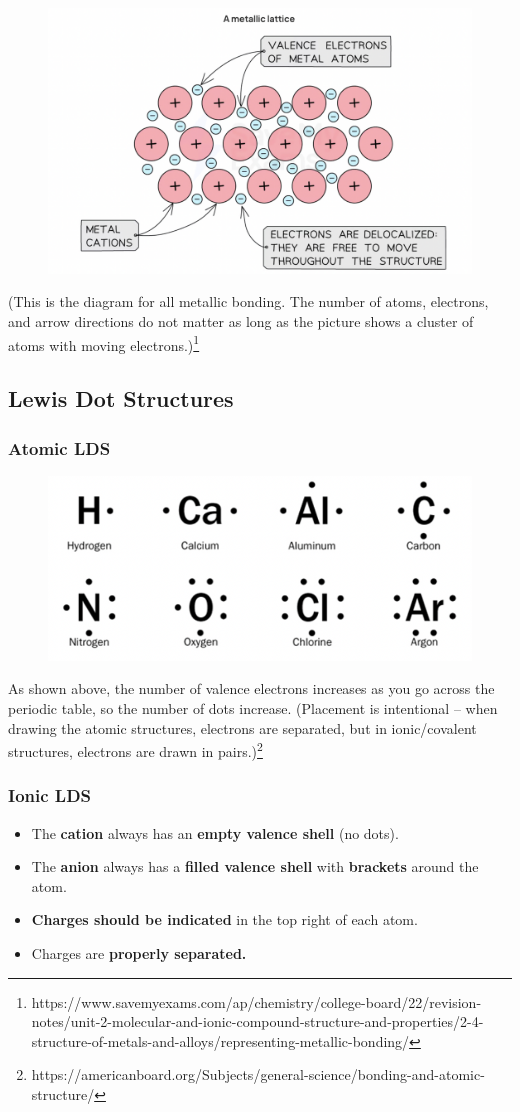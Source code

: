 \documentclass[a4paper, 12pt]{article}
\begin{document}
\begin{figure}[ht]
    \centering
    \includegraphics[width=0.5\linewidth]{metalliclattice.png}
    \label{fig:1.3?}
\end{figure}
\noindent (This is the diagram for all metallic bonding. The number of atoms, electrons, and arrow directions do not matter as long as the picture shows a cluster of atoms with moving electrons.)\footnote{https://www.savemyexams.com/ap/chemistry/college-board/22/revision-notes/unit-2-molecular-and-ionic-compound-structure-and-properties/2-4-structure-of-metals-and-alloys/representing-metallic-bonding/}

\subsection{Lewis Dot Structures}

\subsubsection{Atomic LDS}

\begin{figure}[H] 
    \centering
    \includegraphics[width=0.5\linewidth]{atomiclds.png}
    \label{fig:2}
\end{figure} 
\noindent As shown above, the number of valence electrons increases as you go across the periodic table, so the number of dots increase. (Placement is intentional -- when drawing the atomic structures, electrons are separated, but in ionic/covalent structures, electrons are drawn in pairs.)\footnote{https://americanboard.org/Subjects/general-science/bonding-and-atomic-structure/}

\subsubsection{Ionic LDS}
\begin{itemize}[leftmargin=*,nosep]
    \item The \textbf{cation} always has an \textbf{empty valence shell} (no dots).
    \item The \textbf{anion} always has a \textbf{filled valence shell} with \textbf{brackets} around the atom.
    \item \textbf{Charges should be indicated} in the top right of each atom.
    \item Charges are \textbf{properly separated.}
\end{itemize}
\end{document}
